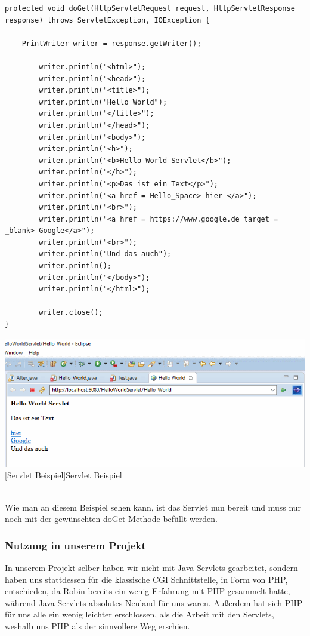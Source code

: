 \documentclass[12pt,a4paper,bibliography=totocnumbered,listof=totocnumbered]{scrartcl}
\begin{document}
\vspace{1em}
\begin{lstlisting}[caption=Servlet Beispielcode, label=lst:servlet-html]
protected void doGet(HttpServletRequest request, HttpServletResponse response) throws ServletException, IOException {

	PrintWriter writer = response.getWriter();
	
		writer.println("<html>");
		writer.println("<head>");
		writer.println("<title>");
		writer.println("Hello World");
		writer.println("</title>");
		writer.println("</head>");
		writer.println("<body>");
		writer.println("<h>");
		writer.println("<b>Hello World Servlet</b>");
		writer.println("</h>");
		writer.println("<p>Das ist ein Text</p>");
		writer.println("<a href = Hello_Space> hier </a>");
		writer.println("<br>");
		writer.println("<a href = https://www.google.de target = _blank> Google</a>");
		writer.println("<br>");
		writer.println("Und das auch");
		writer.println();
		writer.println("</body>");
		writer.println("</html>");
		
		writer.close();		
}			
\end{lstlisting}


\vspace{1em}
\begin{minipage}{\linewidth}
	\centering
	\includegraphics[width=0.9\linewidth]{Bilder/Servlet-Beispiel.png}
	[Servlet Beispiel]{Servlet Beispiel}	
	\label{fig:eclipse6}
\end{minipage}
\\

Wie man an diesem Beispiel sehen kann, ist das Servlet nun bereit und muss nur noch mit der gewünschten doGet-Methode befüllt werden.
\subsubsection{Nutzung in unserem Projekt}
In unserem Projekt selber haben wir nicht mit Java-Servlets gearbeitet, sondern haben uns stattdessen für die klassische CGI Schnittstelle, in Form von PHP, entschieden, da Robin bereits ein wenig Erfahrung mit PHP gesammelt hatte, während Java-Servlets absolutes Neuland für uns waren.
Außerdem hat sich PHP für uns alle ein wenig leichter erschlossen, als die Arbeit mit den Servlets, weshalb uns PHP als der sinnvollere Weg erschien.
\end{document}
